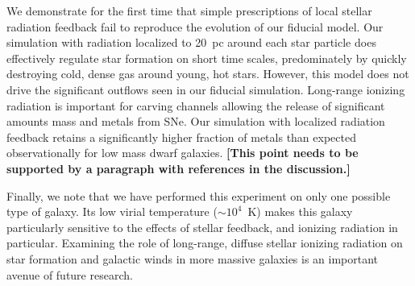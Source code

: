 \documentclass[twocolumn]{aastex62}
\begin{document}
We 
demonstrate
   for the first time 
that simple prescriptions 
    of local stellar radiation feedback fail to reproduce the evolution of our fiducial 
    model.
Our simulation with radiation localized to 20~pc around each star particle does effectively regulate star formation on short time scales, predominately by quickly destroying cold, dense gas around young, hot stars. However, this model does not drive the significant outflows seen in our fiducial simulation. Long-range ionizing radiation is important for carving channels allowing the release of significant amounts mass and metals from SNe. Our simulation with localized radiation feedback retains a significantly higher fraction of metals than expected observationally for low mass dwarf galaxies.  
    {\bf [This point needs to be supported by a paragraph with references in the discussion.]}

Finally, we note that we have performed this experiment on only one possible type of galaxy. Its low virial temperature ($\sim10^{4}$~K) makes this galaxy particularly sensitive to the effects of stellar feedback, and ionizing radiation in particular. Examining the role of long-range, diffuse stellar ionizing radiation on star formation and galactic winds in more massive galaxies is an important avenue of future research. 



\end{document}
